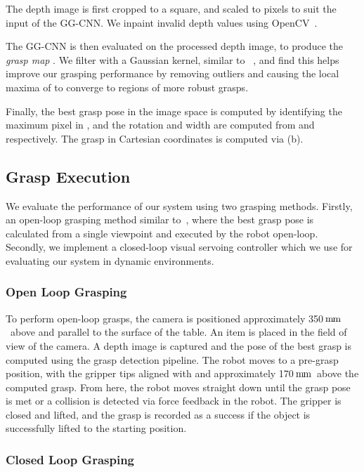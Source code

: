 \documentclass[conference]{IEEEtran}
\newcommand{\pack}	{\hspace{-0.08em}}
\newcommand{\mm}	{\ensuremath{\rm\,m\pack m}}
\begin{document}
The depth image is first cropped to a square, and scaled to  pixels to suit the input of the GG-CNN.  We inpaint invalid depth values using OpenCV~\cite{opencv_library}. 

The GG-CNN is then evaluated on the processed depth image, to produce the \textit{grasp map} .  We filter  with a Gaussian kernel, similar to ~\cite{Johns2016DeepUncertainty}, and find this helps improve our grasping performance by removing outliers and causing the local maxima of  to converge to regions of more robust grasps.

Finally, the best grasp pose in the image space  is computed by identifying the maximum pixel  in , and the rotation and width are computed from  and  respectively.  The grasp in Cartesian coordinates  is computed via  (b).

\subsection{Grasp Execution}

We evaluate the performance of our system using two grasping methods.  Firstly, an open-loop grasping method similar to~\cite{Lenz2015DeepGrasps, Pinto2016SupersizingHours, Mahler2017Dex2}, where the best grasp pose is calculated from a single viewpoint and executed by the robot open-loop.  Secondly, we implement a closed-loop visual servoing controller which we use for evaluating our system in dynamic environments.

\subsubsection{Open Loop Grasping}
\label{sec:openloop}

To perform open-loop grasps, the camera is positioned approximately 350\mm~above and parallel to the surface of the table.  An item is placed in the field of view of the camera.  A depth image is captured and the pose of the best grasp is computed using the grasp detection pipeline.  The robot moves to a pre-grasp position, with the gripper tips aligned with and approximately 170\mm~above the computed grasp.  From here, the robot moves straight down until the grasp pose is met or a collision is detected via force feedback in the robot.  The gripper is closed and lifted, and the grasp is recorded as a success if the object is successfully lifted to the starting position.

\subsubsection{Closed Loop Grasping}
\label{sec:closedloop}
\end{document}
